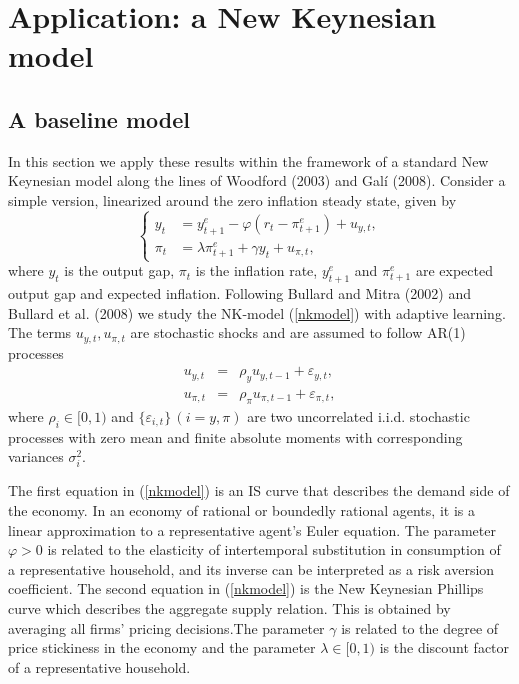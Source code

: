 \section{Application: a New Keynesian model}
\label{sec:NKmodel}
\subsection{A baseline model}
In this section we apply these results within the framework of a standard New Keynesian model along the lines of Woodford (2003) and Gal\'{i} (2008). %
Consider a simple version, linearized around the zero inflation steady state, given by
\begin{equation}\label{nkmodel}
    \left\{
    \begin{split}
          y_{t}&= y_{t+1}^e-\varphi(r_t-\pi_{t+1}^e)+u_{y,t},\\
          \pi_{t}&=\lambda \pi_{t+1}^e + \gamma y_t+u_{\pi,t},
    \end{split}
    \right.
\end{equation}
where $y_t$ is the output gap, $\pi_t$ is the inflation rate, $y_{t+1}^e$ and $\pi_{t+1}^e$ are expected output gap and expected inflation.
Following Bullard and Mitra (2002) and Bullard et al. (2008) we study the NK-model (\ref{nkmodel}) with adaptive learning. The terms $u_{y,t}, u_{\pi,t}$ are stochastic shocks and are assumed to follow AR(1) processes
\begin{eqnarray}\label{nkmodelm}
u_{y,t}&=&\rho_y u_{y,t-1}+\varepsilon_{y,t},\\
u_{\pi,t}&=&\rho_{\pi} u_{\pi,t-1}+\varepsilon_{\pi,t},
\end{eqnarray}
where $\rho_i\in[0,1)$ and $\{\varepsilon_{i,t}\}\, (i=y,\pi) $ are
two uncorrelated i.i.d. stochastic processes with zero mean and
finite absolute moments with corresponding variances $\sigma_i^2$.

The first equation in (\ref{nkmodel}) is an IS curve that describes the demand side of the economy. In an economy of rational or boundedly rational agents, it is a linear approximation to a representative agent's Euler equation. The parameter $\varphi>0$ is %
related to the elasticity of intertemporal substitution in consumption of a representative household, and its inverse can be interpreted as a risk aversion coefficient. The second equation in (\ref{nkmodel}) is the New Keynesian Phillips curve which describes the aggregate supply relation. This is obtained by averaging all firms' pricing decisions.The parameter $\gamma$ is %
related to the degree of price stickiness in the economy and the parameter $\lambda \in[0,1)$ is the discount factor of a representative household.%

